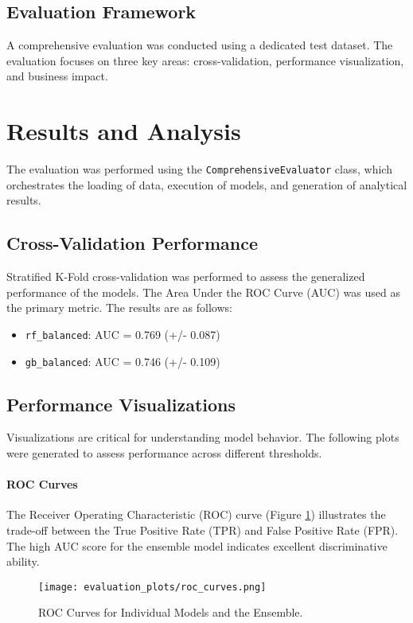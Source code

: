 \documentclass{article}
\begin{document}
\subsection{Evaluation Framework}
A comprehensive evaluation was conducted using a dedicated test dataset. The evaluation focuses on three key areas: cross-validation, performance visualization, and business impact.

\section{Results and Analysis}
The evaluation was performed using the \texttt{ComprehensiveEvaluator} class, which orchestrates the loading of data, execution of models, and generation of analytical results.

\subsection{Cross-Validation Performance}
Stratified K-Fold cross-validation was performed to assess the generalized performance of the models. The Area Under the ROC Curve (AUC) was used as the primary metric. The results are as follows:
\begin{itemize}
    \item \texttt{rf\_balanced}: AUC = 0.769 (+/- 0.087)
    \item \texttt{gb\_balanced}: AUC = 0.746 (+/- 0.109)
\end{itemize}

\subsection{Performance Visualizations}
Visualizations are critical for understanding model behavior. The following plots were generated to assess performance across different thresholds.

\paragraph{ROC Curves} The Receiver Operating Characteristic (ROC) curve (Figure \ref{fig:roc}) illustrates the trade-off between the True Positive Rate (TPR) and False Positive Rate (FPR). The high AUC score for the ensemble model indicates excellent discriminative ability.

\begin{figure}[H]
    \centering
    \texttt{[image: evaluation\_plots/roc\_curves.png]}
    \caption{ROC Curves for Individual Models and the Ensemble.}
    \label{fig:roc}
\end{figure}
\end{document}
